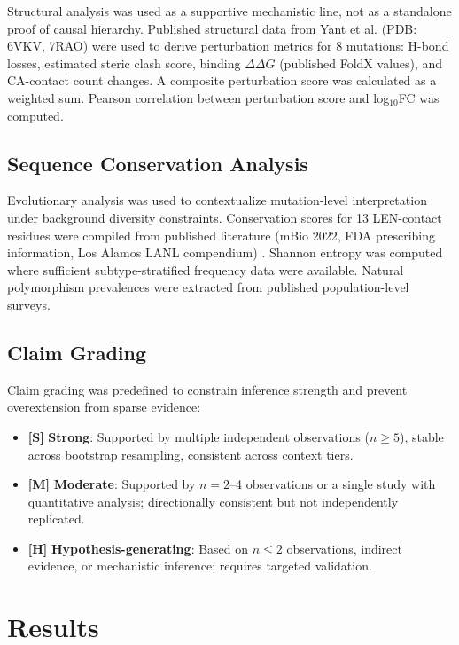 \documentclass[preprint]{elsarticle}
\newcommand{\claimlabel}[1]{\textbf{[#1]}}
\begin{document}
Structural analysis was used as a supportive mechanistic line, not as a standalone proof of causal hierarchy. Published structural data from Yant et al. \cite{Yant2022} (PDB: 6VKV, 7RAO) were used to derive perturbation metrics for 8 mutations: H-bond losses, estimated steric clash score, binding $\Delta\Delta G$ (published FoldX values), and CA-contact count changes. A composite perturbation score was calculated as a weighted sum. Pearson correlation between perturbation score and log$_{10}$FC was computed.

\subsection{Sequence Conservation Analysis}

Evolutionary analysis was used to contextualize mutation-level interpretation under background diversity constraints. Conservation scores for 13 LEN-contact residues were compiled from published literature (mBio 2022, FDA prescribing information, Los Alamos LANL compendium) \cite{Yant2022}. Shannon entropy was computed where sufficient subtype-stratified frequency data were available. Natural polymorphism prevalences were extracted from published population-level surveys.

\subsection{Claim Grading}

Claim grading was predefined to constrain inference strength and prevent overextension from sparse evidence:
\begin{itemize}
  \item \claimlabel{S} \textbf{Strong}: Supported by multiple independent observations ($n \geq 5$), stable across bootstrap resampling, consistent across context tiers.
  \item \claimlabel{M} \textbf{Moderate}: Supported by $n=2$--4 observations or a single study with quantitative analysis; directionally consistent but not independently replicated.
  \item \claimlabel{H} \textbf{Hypothesis-generating}: Based on $n \leq 2$ observations, indirect evidence, or mechanistic inference; requires targeted validation.
\end{itemize}

\section{Results}
\end{document}
